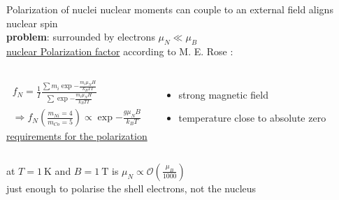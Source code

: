 \documentclass[aspectratio=1610, 10pt]{beamer}
\begin{document}
\begin{frame}{Polarization of nuclei}
	nuclear moments can couple to an external field \textrightarrow aligns nuclear spin\\
	\vspace{0.2cm}
	\textbf{\textrightarrow problem}: surrounded by electrons $\mu_{N} \ll \mu_{B}$\\
	\vspace{0.2cm}
	\underline{nuclear Polarization factor} according to M. E. Rose \cite{PhysRev.75.213}:\\
	\begin{columns}
		\begin{align*}
			f_{N} = \frac{1}{I}\frac{\sum m_{i}\exp{-\frac{m_{i}\mu_{N}H}{k_{B}TI}}}{\sum\exp{-\frac{m_{i}\mu_{N}H}{k_{B}TI}}}\\
			\Longrightarrow f_{N}\left(\frac{m_{Ni}=4}{m_{Co}=5}\right) \propto \exp{-\frac{g \mu_{N}B}{k_{B}T}}
		\end{align*}
		\underline{requirements for the polarization}
		\begin{itemize}
			\item strong magnetic field
			\item temperature close to absolute zero
		\end{itemize}
	\end{columns}
	\vspace{0.5cm}
	at $T=\SI{1}{\kelvin}$ and $B=\SI{1}{\tesla}$ is $\mu_{N} \propto \mathcal{O}\left(\frac{\mu_{B}}{1000}\right)$\\
	\vspace{0.2cm}
	\textrightarrow just enough to polarise the shell electrons, not the nucleus
\end{frame}
\end{document}
